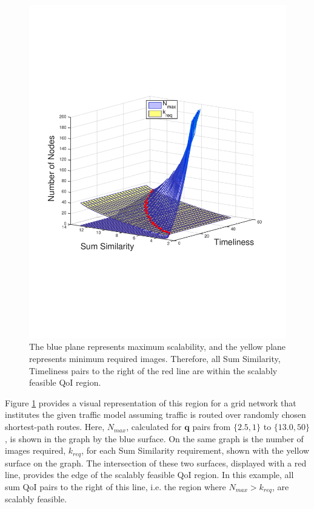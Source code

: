\vspace{-4mm}
\begin{figure}[ht]
\centering
\includegraphics[scale=0.31, clip=true, trim=10mm 65mm 20mm 77mm]{figures/scal_feas_qoi/scal_feas_qoi_region_3d_plot_3.pdf}
\vspace{-5mm}
\caption{The blue plane represents maximum scalability, and the yellow plane represents minimum required images.  Therefore, all {Sum Similarity, Timeliness} pairs to the right of the red line are within the scalably feasible QoI region.}
 \label{fig:scal_feasible_region}
 \vspace{-3mm}
\end{figure}

Figure \ref{fig:scal_feasible_region} provides a visual representation of this region for a grid network that institutes the given traffic model assuming traffic is routed over randomly chosen shortest-path routes.
Here, $N_{max}$, calculated for $\mathbf{q}$ pairs from $\{2.5,1\}$ to $\{13.0, 50\}$, is shown in the graph by the blue surface.  On the same graph is the number of images required, $k_{req}$, for each Sum Similarity requirement, shown with the yellow surface on the graph.  The intersection of these two surfaces, displayed with a red line, provides the edge of the scalably feasible QoI region.  In this example, all sum QoI pairs to the right of this line, i.e. the region where $N_{max} > k_{req}$, are scalably feasible.  

